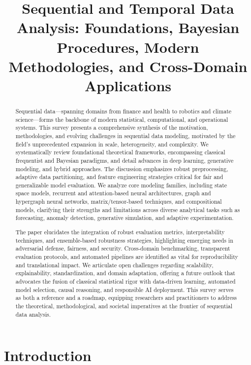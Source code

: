\documentclass[sigconf]{acmart}
\title{Sequential and Temporal Data Analysis: Foundations, Bayesian Procedures, Modern Methodologies, and Cross-Domain Applications}
\begin{document}
\begin{abstract}
Sequential data—spanning domains from finance and health to robotics and climate science—forms the backbone of modern statistical, computational, and operational systems. This survey presents a comprehensive synthesis of the motivation, methodologies, and evolving challenges in sequential data modeling, motivated by the field’s unprecedented expansion in scale, heterogeneity, and complexity. We systematically review foundational theoretical frameworks, encompassing classical frequentist and Bayesian paradigms, and detail advances in deep learning, generative modeling, and hybrid approaches. The discussion emphasizes robust preprocessing, adaptive data partitioning, and feature engineering strategies critical for fair and generalizable model evaluation. We analyze core modeling families, including state space models, recurrent and attention-based neural architectures, graph and hypergraph neural networks, matrix/tensor-based techniques, and compositional models, clarifying their strengths and limitations across diverse analytical tasks such as forecasting, anomaly detection, generative simulation, and adaptive experimentation.

The paper elucidates the integration of robust evaluation metrics, interpretability techniques, and ensemble-based robustness strategies, highlighting emerging needs in adversarial defense, fairness, and security. Cross-domain benchmarking, transparent evaluation protocols, and automated pipelines are identified as vital for reproducibility and translational impact. We articulate open challenges regarding scalability, explainability, standardization, and domain adaptation, offering a future outlook that advocates the fusion of classical statistical rigor with data-driven learning, automated model selection, causal reasoning, and responsible AI deployment. This survey serves as both a reference and a roadmap, equipping researchers and practitioners to address the theoretical, methodological, and societal imperatives at the frontier of sequential data analysis.
\end{abstract}

\maketitle

\section{Introduction}
\end{document}
